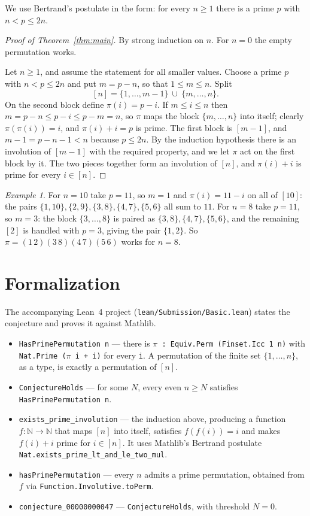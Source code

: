 \documentclass[11pt]{article}
\theoremstyle{plain}
\theoremstyle{remark}
\newtheorem{example}[theorem]{Example}
\begin{document}
We use Bertrand's postulate in the form: for every $n\ge1$ there is a prime $p$
with $n<p\le 2n$.

\begin{proof}[Proof of Theorem~\ref{thm:main}]
By strong induction on $n$. For $n=0$ the empty permutation works.

Let $n\ge1$, and assume the statement for all smaller values. Choose a prime
$p$ with $n<p\le2n$ and put $m=p-n$, so that $1\le m\le n$. Split
\[
  [n]=\{1,\ldots,m-1\}\ \cup\ \{m,\ldots,n\}.
\]
On the second block define $\pi(i)=p-i$. If $m\le i\le n$ then
$m=p-n\le p-i\le p-m=n$, so $\pi$ maps the block $\{m,\ldots,n\}$ into
itself; clearly $\pi(\pi(i))=i$, and $\pi(i)+i=p$ is prime. The first block is
$[m-1]$, and $m-1=p-n-1<n$ because $p\le 2n$. By the induction hypothesis there
is an involution of $[m-1]$ with the required property, and we let $\pi$ act on
the first block by it. The two pieces together form an involution of $[n]$, and
$\pi(i)+i$ is prime for every $i\in[n]$.
\end{proof}

\begin{example}
For $n=10$ take $p=11$, so $m=1$ and $\pi(i)=11-i$ on all of $[10]$: the pairs
$\{1,10\},\{2,9\},\{3,8\},\{4,7\},\{5,6\}$ all sum to $11$. For $n=8$ take
$p=11$, so $m=3$: the block $\{3,\ldots,8\}$ is paired as
$\{3,8\},\{4,7\},\{5,6\}$, and the remaining $[2]$ is handled with $p=3$,
giving the pair $\{1,2\}$. So $\pi=(1\,2)(3\,8)(4\,7)(5\,6)$ works for $n=8$.
\end{example}

\section{Formalization}

The accompanying Lean~4 project (\texttt{lean/Submission/Basic.lean}) states
the conjecture and proves it against Mathlib.

\begin{itemize}
  \item \texttt{HasPrimePermutation n} --- there is
    \texttt{$\pi$ : Equiv.Perm (Finset.Icc 1 n)} with
    \texttt{Nat.Prime ($\pi$ i + i)} for every \texttt{i}. A permutation of the
    finite set $\{1,\ldots,n\}$, as a type, is exactly a permutation of $[n]$.
  \item \texttt{ConjectureHolds} --- for some $N$, every even $n\ge N$
    satisfies \texttt{HasPrimePermutation n}.
  \item \texttt{exists\_prime\_involution} --- the induction above, producing
    a function $f\colon\mathbb N\to\mathbb N$ that maps $[n]$ into itself,
    satisfies $f(f(i))=i$ and makes $f(i)+i$ prime for $i\in[n]$. It uses
    Mathlib's Bertrand postulate
    \texttt{Nat.exists\_prime\_lt\_and\_le\_two\_mul}.
  \item \texttt{hasPrimePermutation} --- every $n$ admits a prime permutation,
    obtained from $f$ via \texttt{Function.Involutive.toPerm}.
  \item \texttt{conjecture\_00000000047} --- \texttt{ConjectureHolds}, with
    threshold $N=0$.
\end{itemize}
\end{document}

